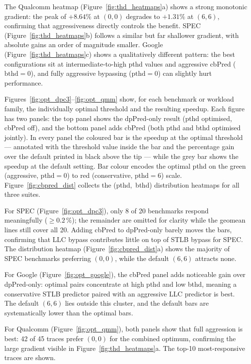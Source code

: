 \documentclass[12pt]{article}
\begin{document}
The Qualcomm heatmap (Figure~\ref{fig:thd_heatmaps}a) shows a strong monotonic
gradient: the peak of $+8.64\%$ at $(0,0)$ degrades to $+1.31\%$ at $(6,6)$,
confirming that aggressiveness directly controls the benefit.
SPEC (Figure~\ref{fig:thd_heatmaps}b) follows a similar but far shallower
gradient, with absolute gains an order of magnitude smaller.
Google (Figure~\ref{fig:thd_heatmaps}c) shows a qualitatively different
pattern: the best configurations sit at intermediate-to-high pthd values and
aggressive cbPred ($\text{bthd}=0$), and fully aggressive bypassing
($\text{pthd}=0$) can slightly hurt performance.

Figures~\ref{fig:opt_dpc3}--\ref{fig:opt_qmm} show, for each benchmark or
workload family, the individually optimal threshold and the resulting speedup.
Each figure has two panels: the top panel shows the dpPred-only result (pthd
optimised, cbPred off), and the bottom panel adds cbPred (both pthd and bthd
optimised jointly).  In every panel the coloured bar is the speedup at the
optimal threshold — annotated with the threshold value inside the bar and the
percentage gain over the default printed in black above the tip — while the
grey bar shows the speedup at the default setting.  Bar colour encodes the
optimal pthd on the green (aggressive, pthd$=0$) to red (conservative,
pthd$=6$) scale.  Figure~\ref{fig:cbpred_dist} collects the (pthd,~bthd)
distribution heatmaps for all three suites.

For SPEC (Figure~\ref{fig:opt_dpc3}), only 8 of 20 benchmarks respond
meaningfully ($\geq 0.2\,\%$); the remainder are omitted for clarity while the
geomean lines still cover all 20.  Adding cbPred to dpPred-only barely moves
the bars, confirming that LLC bypass contributes little on top of STLB bypass
for SPEC.  The distribution heatmap (Figure~\ref{fig:cbpred_dist}a) shows the
majority of SPEC benchmarks preferring $(0,0)$, while the default $(6,6)$
attracts none.

For Google (Figure~\ref{fig:opt_google}), the cbPred panel adds noticeable
gain over dpPred-only: optimal pairs concentrate at high pthd and low bthd,
meaning a conservative STLB predictor paired with an aggressive LLC predictor
is best.  The default $(6,6)$ lies outside this cluster, and the default bars
are systematically lower than the optimal bars.

For Qualcomm (Figure~\ref{fig:opt_qmm}), both panels show that full
aggression is best: 42 of 45 traces prefer $(0,0)$ for the combined
optimum, confirming the large gradient visible in Figure~\ref{fig:thd_heatmaps}a.
The top-10 most-responsive traces are shown.
\end{document}

